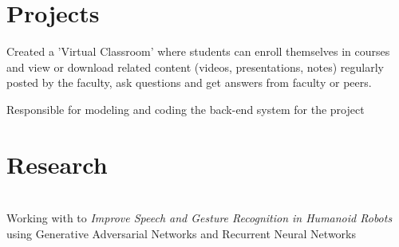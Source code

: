 \documentclass[]{deedy-resume-openfont}
\begin{document}
\begin{minipage}[t]{0.66\textwidth} 


\section{Projects}


\href{https://github.com/Ellusionists/VirtualClassroom}{}
\vspace{\topsep} %
\begin{tightemize}
\item Created a 'Virtual Classroom' where students can enroll themselves in courses and view or download related content (videos, presentations, notes) regularly posted by the faculty, ask questions and get answers from faculty or peers.
\item Responsible for modeling and coding the back-end system for the project
\end{tightemize}
\sectionsep


\section{Research}
\href{http://robita.iiita.ac.in/}{}\\
Working with  to \textit{Improve Speech and Gesture Recognition in Humanoid Robots} using Generative Adversarial Networks and Recurrent Neural Networks
\sectionsep


\end{minipage}
\end{document}
